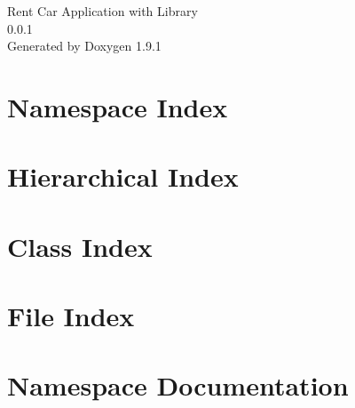 \let\mypdfximage\pdfximage\def\pdfximage{\immediate\mypdfximage}\documentclass[twoside]{book}
\newcommand{\+}{\discretionary{\mbox{\scriptsize$\hookleftarrow$}}{}{}}
\newcommand{\clearemptydoublepage}{%
  \newpage{\pagestyle{empty}\cleardoublepage}%
}
\begin{document}
\raggedbottom

\hypersetup{pageanchor=false,
             bookmarksnumbered=true,
             pdfencoding=unicode
            }
\begin{titlepage}
\vspace*{7cm}
\begin{center}%
{\Large Rent Car Application with Library \\[1ex]\large 0.\+0.\+1 }\\
\vspace*{1cm}
{\large Generated by Doxygen 1.9.1}\\
\end{center}
\end{titlepage}
\clearemptydoublepage
{}
\tableofcontents
\clearemptydoublepage
{}
\hypersetup{pageanchor=true}

\chapter{Namespace Index}

\chapter{Hierarchical Index}

\chapter{Class Index}

\chapter{File Index}

\chapter{Namespace Documentation}





\end{document}
